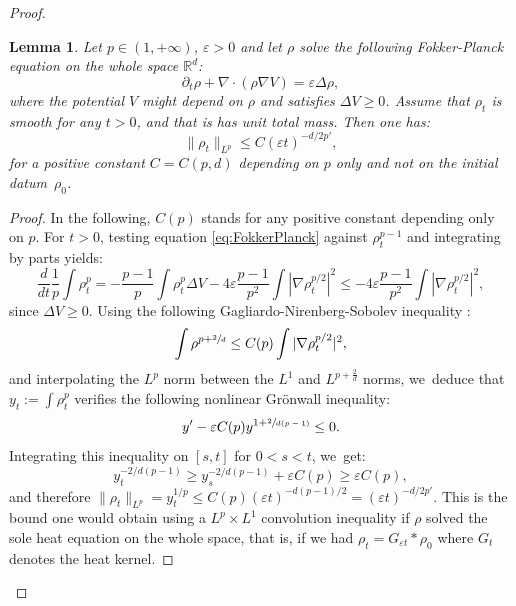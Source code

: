 \documentclass[JEP,XML,SOM,Unicode, NoFloatCountersInSection,published]{cedram}
\def\RR{\mathbb{R}}
\def\eps{\varepsilon}
\def\pa{\partial}
\theoremstyle{plain}
\newtheorem{lemma}[theorem]{Lemma}
\theoremstyle{definition}
\begin{document}
\begin{proof}
\begin{lemma}\label{lemma:LpBoundRho}
Let $p \in (1,+\infty)$, $\eps > 0$ and let $\rho$ solve the following Fokker-Planck equation on the whole space $\RR^d$:
\begin{equation}\label{eq:FokkerPlanck}
\pa_t \rho + \nabla \cdot (\rho \nabla V) = \eps \Delta \rho,
\end{equation}
where the potential $V$ might depend on $\rho$ and satisfies $\Delta V \geq 0$. Assume that $\rho_t$ is smooth for any $t>0$, and that is has unit total mass. Then one has:
\[
\|\rho_t\|_{L^p} \leq C(\eps t)^{-d/2p'},
\]
for a positive constant $C=C(p,d)$ depending on $p$ only and not on the initial datum~$\rho_0$.
\end{lemma}
\begin{proof}
In the following, $C(p)$ stands for any positive constant depending only on $p$. For $t>0$, testing equation \eqref{eq:FokkerPlanck} against $\rho_t^{p-1}$ and integrating by parts yields:
\[
\frac{d}{dt} \frac 1p \int \rho_t^p = - \frac{p-1}{p} \int \rho_t^p \Delta V - 4 \eps \frac{p-1}{p^2} \int |\nabla \rho_t^{p/2}|^2 \leq - 4 \eps \frac{p-1}{p^2} \int |\nabla \rho_t^{p/2}|^2,
\]
since $\Delta V \geq 0$. Using the following Gagliardo-Nirenberg-Sobolev inequality \cite{gagliardo59, nirenberg59}:
\[
\int \rho^{p+\sfrac 2d} \leq C(p) \int |\nabla \rho_t^{p/2}|^2,
\]
and interpolating the $L^p$ norm between the $L^1$ and $L^{p+\frac 2d}$ norms, we~deduce that $y_t := \int \rho_t^p$ verifies the following nonlinear Grönwall inequality:
\[
y' - \eps C(p) y^{1+\sfrac{2}{d(p-1)}} \leq 0.
\]
Integrating this inequality on $[s,t]$ for $0<s<t$, we~get:
\[
y_t^{-2/d(p-1)} \geq y_s^{-2/d(p-1)} + \eps C(p) \geq \eps C(p),
\]
and therefore $\|\rho_t\|_{L^p} = y_t^{1/p} \leq C(p) (\eps t)^{-d(p-1)/2} = (\eps t)^{-d/2p'}$. This is the bound one would obtain using a $L^p \times L^1$ convolution inequality if $\rho$ solved the sole heat equation on the whole space, that is, if we had $\rho_t = G_{\eps t} * \rho_0$ where $G_t$ denotes the heat kernel.
\end{proof}


\end{proof}
\end{document}
